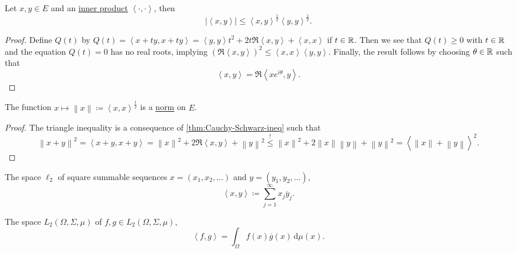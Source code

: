 \begin{theorem}\label{thm:Cauchy-Schwarz-ineq}
	Let \(x, y\in E\) and an \hyperref[def:inner-product]{inner product} \(\left\langle \cdot, \cdot \right\rangle \), then
	\[
		\left\vert \left\langle x, y \right\rangle  \right\vert \leq \left\langle x, y \right\rangle ^{\frac{1}{2}}\left\langle y, y \right\rangle ^{\frac{1}{2}}.
	\]
\end{theorem}
\begin{proof}
	Define \(Q(t)\) by \(Q(t) = \left\langle x+ty, x+ty \right\rangle = \left\langle y, y \right\rangle t^{2} + 2t \Re\left\langle x, y \right\rangle + \left\langle x,x \right\rangle\) if \(t\in \mathbb{\MakeUppercase{r}} \). Then we see that \(Q(t) \geq 0\) with \(t\in \mathbb{\MakeUppercase{r}} \) and the equation \(Q(t) = 0\) has no real roots, implying \((\Re\left\langle x, y \right\rangle) ^{2} \leq \left\langle x, x \right\rangle \left\langle y, y \right\rangle\). Finally, the result follows by choosing \(\theta \in \mathbb{\MakeUppercase{r}} \) such that
	\[
		\left\langle x, y \right\rangle = \Re\left\langle x e^{i\theta}, y \right\rangle.
	\]
\end{proof}

\begin{corollary}
	The function \(x\mapsto \left\lVert x\right\rVert \coloneqq \left\langle x, x \right\rangle ^{\frac{1}{2}}\) is a \hyperref[def:norm]{norm} on \(E\).
\end{corollary}
\begin{proof}
	The triangle inequality is a consequence of \autoref{thm:Cauchy-Schwarz-ineq} such that
	\[
		\left\lVert x+y\right\rVert ^{2} = \left\langle x+y, x+y \right\rangle = \left\lVert x\right\rVert ^{2} + 2\Re\left\langle x, y \right\rangle + \left\lVert y\right\rVert ^{2} \overset{\hyperref[thm:Cauchy-Schwarz-ineq]{\text{!}}}{\leq} \left\lVert x\right\rVert ^{2} + 2\left\lVert x\right\rVert \left\lVert y\right\rVert + \left\lVert y\right\rVert ^{2} = \left\langle \left\lVert x\right\rVert + \left\lVert y\right\rVert  \right\rangle ^{2} .
	\]
\end{proof}

\begin{eg}
	The space \(\ell _2\) of square summable sequences \(x=(x_1, x_2, \ldots  )\) and \(y=(y_1, y_2, \ldots  )\),
	\[
		\left\langle x, y \right\rangle \coloneqq \sum_{j=1}^{\infty} x_j \overline{y} _j.
	\]
\end{eg}

\begin{eg}
	The space \(L_2(\Omega , \Sigma , \mu )\) of \(f, g\in L_2(\Omega , \Sigma , \mu )\),
	\[
		\left\langle f, g \right\rangle = \int _\Omega f(x) \overline{g} (x)\,\mathrm{d} \mu (x).
	\]
\end{eg}

